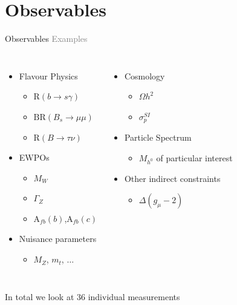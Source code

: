 \documentclass{beamer}
\begin{document}
\section{Observables}
\begin{frame}{Observables}
  \textcolor{gray}{Examples}
  \begin{columns}[t]
  \column{2.0in}
  \begin{itemize}
    \item Flavour Physics 
      \begin{itemize}
        \item $\textrm{R}\left(b\rightarrow s\gamma\right)$
        \item $\textrm{BR}\left(B_{s}\rightarrow\mu\mu\right)$
        \item $\textrm{R}\left(B\rightarrow\tau\nu\right)$
      \end{itemize}
    \item EWPOs 
      \begin{itemize}
        \item $M_{W}$
        \item $\Gamma_{Z}$
        \item $\textrm{A}_{fb}(b)$,$\textrm{A}_{fb}(c)$
      \end{itemize}
     \item Nuisance parameters
      \begin{itemize}
        \item $M_{Z}$, $m_{t}$, $\hdots$
      \end{itemize}
  \end{itemize}
  \column{2.0in}
  \begin{itemize}
    \item Cosmology
      \begin{itemize}
        \item $\Omega h^{2}$ 
        \item $\sigma_{p}^{SI}$
      \end{itemize}
    \item Particle Spectrum
      \begin{itemize}
        \item $M_{h^{0}}$ of particular interest
      \end{itemize}
    \item Other indirect constraints
      \begin{itemize}
        \item $\Delta(g_{\mu}-2)$
      \end{itemize}
  \end{itemize}
  \end{columns}
  \vfill
  In total we look at 36 individual measurements

\end{frame}
\end{document}

